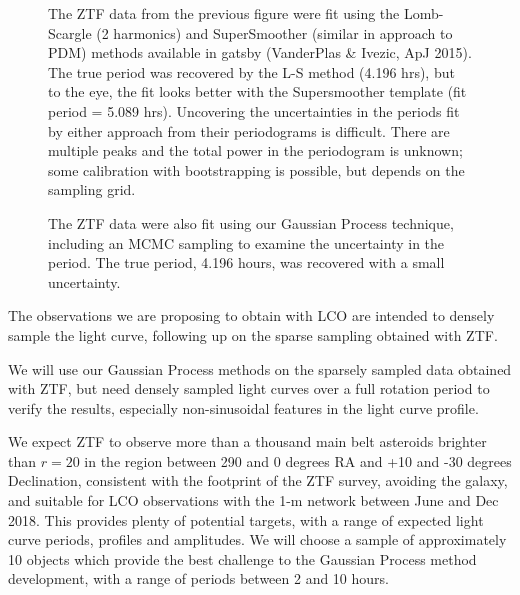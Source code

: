 \documentclass[11pt]{article}
\begin{document}
\begin{figure}[hbt]
\caption{The ZTF data from the previous figure were fit using the Lomb-Scargle (2 harmonics) and SuperSmoother (similar in approach to PDM) methods available in gatsby (VanderPlas \& Ivezic, ApJ 2015). The true period was recovered by the L-S method (4.196 hrs), but to the eye, the fit looks better with the Supersmoother template (fit period = 5.089 hrs). Uncovering the uncertainties in the periods fit by either approach from their periodograms is difficult. There are multiple peaks and the total power in the periodogram is unknown; some calibration with bootstrapping is possible, but depends on the sampling grid.}
\end{figure}

\begin{figure}[hbt]
\caption{The ZTF data were also fit using our Gaussian Process technique, including an MCMC sampling to examine the uncertainty in the period. The true period, 4.196 hours, was recovered with a small uncertainty.}
\end{figure}

\clearpage


%

%

\expdesign
The observations we are proposing to obtain with LCO are intended to
densely sample the light curve, following up on the sparse sampling
obtained with ZTF.

We will use our Gaussian Process methods on the sparsely sampled data
obtained with ZTF, but need densely sampled light curves over a full
rotation period to verify the results, especially non-sinusoidal
features in the light curve profile. 

We expect ZTF to observe more than a thousand main belt asteroids
brighter than $r=20$ in the region between 290 and 0 degrees RA and 
+10 and -30 degrees Declination, consistent with the footprint of the
ZTF survey, avoiding the galaxy, and suitable for LCO observations with
the 1-m network between June and Dec 2018. This provides plenty of
potential targets, with a range of expected light curve periods,
profiles and amplitudes. We will choose a sample of approximately 10
objects which provide the best challenge to the Gaussian Process method
development, with a range of periods between 2 and 10 hours. 
\end{document}
